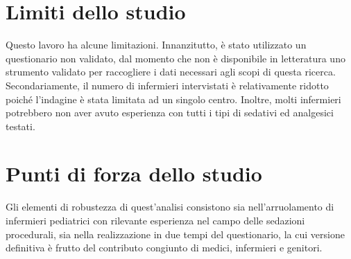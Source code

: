 
\section{Limiti dello studio}
Questo lavoro ha alcune limitazioni. Innanzitutto, è stato utilizzato un questionario non validato, dal momento che non è disponibile in letteratura uno strumento validato per raccogliere i dati necessari agli scopi di questa ricerca. Secondariamente, il numero di infermieri intervistati è relativamente ridotto poiché l'indagine è stata limitata ad un singolo centro. Inoltre, molti infermieri potrebbero non aver avuto esperienza con tutti i tipi di sedativi ed analgesici testati. 

\section{Punti di forza dello studio}
Gli elementi di robustezza di quest'analisi consistono sia nell'arruolamento di infermieri pediatrici con rilevante esperienza nel campo delle sedazioni procedurali, sia nella realizzazione in due tempi del questionario, la cui versione definitiva è frutto del contributo congiunto di medici, infermieri e genitori. 